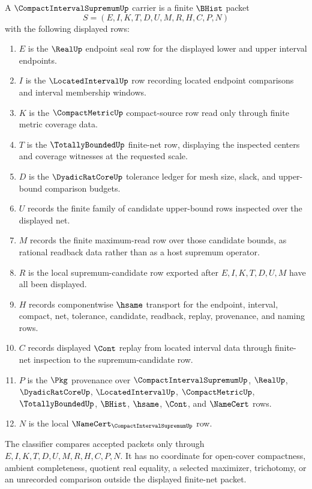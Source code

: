 \begin{definition}
\label{def:compact-interval-supremum-carrier}
A $\CompactIntervalSupremumUp$ carrier is a finite $\BHist$ packet
$$
S=(E,I,K,T,D,U,M,R,H,C,P,N)
$$
with the following displayed rows:
\begin{enumerate}
\item $E$ is the $\RealUp$ endpoint seal row for the displayed lower and upper interval endpoints.
\item $I$ is the $\LocatedIntervalUp$ row recording located endpoint comparisons and interval membership windows.
\item $K$ is the $\CompactMetricUp$ compact-source row read only through finite metric coverage data.
\item $T$ is the $\TotallyBoundedUp$ finite-net row, displaying the inspected centers and coverage witnesses at the requested scale.
\item $D$ is the $\DyadicRatCoreUp$ tolerance ledger for mesh size, slack, and upper-bound comparison budgets.
\item $U$ records the finite family of candidate upper-bound rows inspected over the displayed net.
\item $M$ records the finite maximum-read row over those candidate bounds, as rational readback data rather than as a host supremum operator.
\item $R$ is the local supremum-candidate row exported after $E,I,K,T,D,U,M$ have all been displayed.
\item $H$ records componentwise $\hsame$ transport for the endpoint, interval, compact, net, tolerance, candidate, readback, replay, provenance, and naming rows.
\item $C$ records displayed $\Cont$ replay from located interval data through finite-net inspection to the supremum-candidate row.
\item $P$ is the $\Pkg$ provenance over $\CompactIntervalSupremumUp$, $\RealUp$, $\DyadicRatCoreUp$, $\LocatedIntervalUp$, $\CompactMetricUp$, $\TotallyBoundedUp$, $\BHist$, $\hsame$, $\Cont$, and $\NameCert$ rows.
\item $N$ is the local $\NameCert_{\CompactIntervalSupremumUp}$ row.
\end{enumerate}
The classifier compares accepted packets only through $E,I,K,T,D,U,M,R,H,C,P,N$. It has no coordinate for open-cover compactness, ambient completeness, quotient real equality, a selected maximizer, trichotomy, or an unrecorded comparison outside the displayed finite-net packet.
\end{definition}

